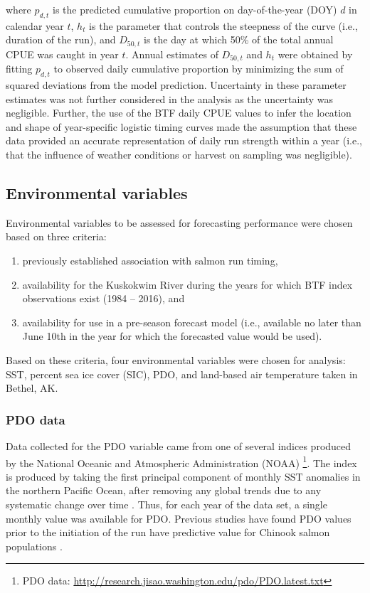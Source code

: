 \documentclass[12pt,]{book}
\providecommand{\tightlist}{%
  \setlength{\itemsep}{0pt}\setlength{\parskip}{0pt}}
\let\rmarkdownfootnote\footnote%
\def\footnote{\protect\rmarkdownfootnote}
\theoremstyle{definition}
\theoremstyle{definition}
\theoremstyle{definition}
\theoremstyle{remark}
\begin{document}
\noindent
where \(p_{d,t}\) is the predicted cumulative proportion on
day-of-the-year (DOY) \(d\) in calendar year \(t\), \(h_t\) is the
parameter that controls the steepness of the curve (i.e., duration of
the run), and \(D_{50,t}\) is the day at which 50\% of the total annual
CPUE was caught in year \(t\). Annual estimates of \(D_{50,t}\) and
\(h_t\) were obtained by fitting \(p_{d,t}\) to observed daily
cumulative proportion by minimizing the sum of squared deviations from
the model prediction. Uncertainty in these parameter estimates was not
further considered in the analysis as the uncertainty was negligible.
Further, the use of the BTF daily CPUE values to infer the location and
shape of year-specific logistic timing curves made the assumption that
these data provided an accurate representation of daily run strength
within a year (i.e., that the influence of weather conditions or harvest
on sampling was negligible).

\subsection{Environmental variables}\label{environmental-variables}

\noindent
Environmental variables to be assessed for forecasting performance were
chosen based on three criteria:

\begin{enumerate}
\def\labelenumi{(\arabic{enumi})}
\tightlist
\item
  previously established association with salmon run timing,
\item
  availability for the Kuskokwim River during the years for which BTF
  index observations exist (1984 -- 2016), and
\item
  availability for use in a pre-season forecast model (i.e., available
  no later than June 10th in the year for which the forecasted value
  would be used).
\end{enumerate}

\noindent
Based on these criteria, four environmental variables were chosen for
analysis: SST, percent sea ice cover (SIC), PDO, and land-based air
temperature taken in Bethel, AK.

\subsubsection{PDO data}\label{pdo-data}

\noindent
Data collected for the PDO variable came from one of several indices
produced by the National Oceanic and Atmospheric Administration (NOAA)
\citep{mantua-etal-1997}\footnote{PDO data:
  \url{http://research.jisao.washington.edu/pdo/PDO.latest.txt}}. The
index is produced by taking the first principal component of monthly SST
anomalies in the northern Pacific Ocean, after removing any global
trends due to any systematic change over time \citep{mantua-etal-1997}.
Thus, for each year of the data set, a single monthly value was
available for PDO. Previous studies have found PDO values prior to the
initiation of the run have predictive value for Chinook salmon
populations \citep{beer-2007, keefer-etal-2008}.
\end{document}
